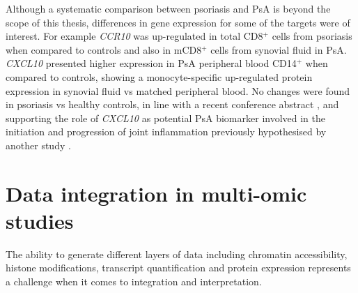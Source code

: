 Although a systematic comparison between psoriasis and PsA is beyond the scope of this thesis, differences in gene expression for some of the targets were of interest. %
For example \textit{CCR10} was up-regulated  in total CD8$^+$ cells from psoriasis when compared to controls and also in mCD8$^+$ cells from synovial fluid in PsA. \textit{CXCL10} presented higher expression in PsA peripheral blood CD14$^+$ when compared to controls, showing a monocyte-specific up-regulated protein expression in synovial fluid vs matched peripheral blood. No changes were found in psoriasis vs healthy controls, in line with a recent conference abstract \parencite{Muntyanu2017}, and supporting the role of \textit{CXCL10} as potential PsA biomarker involved in the initiation and progression of joint inflammation previously hypothesised by another study \parencite{Abji2016}.




\section{Data integration in multi-omic studies}
The ability to generate different layers of data including chromatin accessibility, histone modifications, transcript quantification and protein expression represents a challenge when it comes to integration and interpretation.

